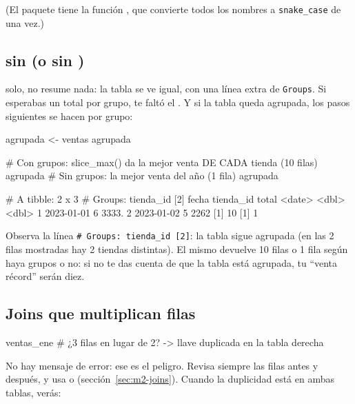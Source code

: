 (El paquete  tiene la función , que
convierte todos los nombres a \texttt{snake\_case} de una vez.)

\subsection{\texorpdfstring{}{group\_by()} sin \texorpdfstring{}{summarise()} (o sin \texorpdfstring{}{ungroup()})}

 solo, no resume nada: la tabla se ve igual, con una
línea extra de \texttt{Groups}. Si esperabas un total por grupo, te faltó
el . Y si la tabla queda agrupada, los pasos siguientes
se hacen por grupo:

\begin{rcode}
agrupada <- ventas %
agrupada %

# Con grupos: slice_max() da la mejor venta DE CADA tienda (10 filas)
agrupada %
# Sin grupos: la mejor venta del año (1 fila)
agrupada %
\end{rcode}
\begin{rsalida}
# A tibble: 2 x 3
# Groups:   tienda_id [2]
  fecha      tienda_id total
  <date>         <dbl> <dbl>
1 2023-01-01         6 3333.
2 2023-01-02         5 2262 
[1] 10
[1] 1
\end{rsalida}

Observa la línea \texttt{\# Groups: tienda\_id [2]}: la tabla sigue
agrupada (en las 2 filas mostradas hay 2 tiendas distintas). El mismo
 devuelve 10 filas o 1 fila según haya
grupos o no: si no te das cuenta de que la tabla está agrupada, tu ``venta
récord'' serán diez.

\subsection{Joins que multiplican filas}

\begin{rnoejecutar}
ventas_ene %
# ¿3 filas en lugar de 2? -> llave duplicada en la tabla derecha
\end{rnoejecutar}

No hay mensaje de error: ese es el peligro. Revisa siempre las filas antes y
después, y usa  o
 (sección~\ref{sec:m2-joins}). Cuando la
duplicidad está en ambas tablas, verás:

